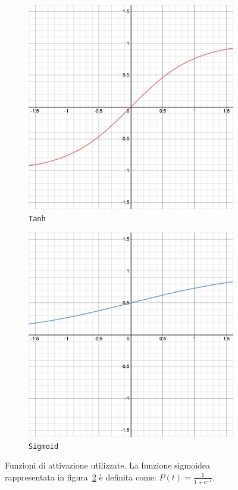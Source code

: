 \documentclass[12pt,a4paper,final]{book}
\begin{document}
\begin{figure}[!ht]
\centering
	\begin{subfigure}{0.45\textwidth}
	    \centering
	    \includegraphics[width=\linewidth]{../figures/tanh.png}
	    \caption{\texttt{Tanh}}
	    \label{tanh}
	\end{subfigure}
	\begin{subfigure}{0.45\textwidth}
		\centering
	    \includegraphics[width=\linewidth]{../figures/sigmoid.png}
		\caption{\texttt{Sigmoid}}
		\label{sigmoid}
	\end{subfigure}
\caption{Funzioni di attivazione utilizzate. La funzione sigmoidea rappresentata in figura~\ref{sigmoid} è definita come: $P(t)=\frac{1}{1+e^{-t}}$.}
\label{act_fun}
\end{figure}
\end{document}
